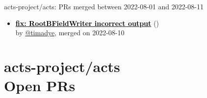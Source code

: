 \begin{frame}[allowframebreaks]{ acts-project/acts: PRs merged 
between 2022-08-01 and 2022-08-11
}
\begin{itemize}
    \item\prmerged\textbf{\href{https://github.com/acts-project/acts/pull/1381}{\textcolor{black}{fix: RootBFieldWriter incorrect output}}}
    (\href{https://github.com/acts-project/acts/pull/1381}{}) \\
    by \href{https://github.com/timadye}{@timadye}, merged on 2022-08-10

  \end{itemize}

\end{frame}



\section{ acts-project/acts \\ Open PRs}


